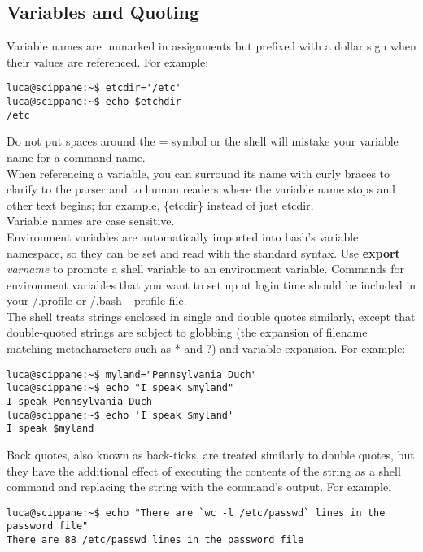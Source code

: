 \documentclass[10pt,letterpaper]{book}
\begin{document}
\subsection{Variables and Quoting}
Variable names are unmarked in assignments but prefixed with a dollar sign when
their values are referenced. For example:
\begin{lstlisting}
luca@scippane:~$ etcdir='/etc'
luca@scippane:~$ echo $etchdir
/etc
\end{lstlisting}
Do not put spaces around the = symbol or the shell will mistake your variable
name for a command name.\\
When referencing a variable, you can surround its name with curly braces to clarify to the parser and to human readers where the variable name stops and other text begins; for example, \textdollar \{etcdir\} instead of just \textdollar etcdir.\\
Variable names are case sensitive.\\
Environment variables are automatically imported into bash's variable namespace, so they can be set and read with the standard syntax. Use \textbf{export} \textit{varname} to promote a shell variable to an environment variable. Commands for environment variables that you want to set up at login time should be included in your /.profile or /.bash\_ profile file.\\
The shell treats strings enclosed in single and double quotes similarly, except that double-quoted strings are subject to globbing (the expansion of filename matching metacharacters such as * and ?) and variable expansion. For example:
\begin{lstlisting}
luca@scippane:~$ myland="Pennsylvania Duch"
luca@scippane:~$ echo "I speak $myland"
I speak Pennsylvania Duch
luca@scippane:~$ echo 'I speak $myland'
I speak $myland
\end{lstlisting}
Back quotes, also known as back-ticks, are treated similarly to double quotes, but they have the additional effect of executing the contents of the string as a shell command and replacing the string with the command's output. For example,
\begin{lstlisting}
luca@scippane:~$ echo "There are `wc -l /etc/passwd` lines in the password file"
There are 88 /etc/passwd lines in the password file
\end{lstlisting}
\end{document}
